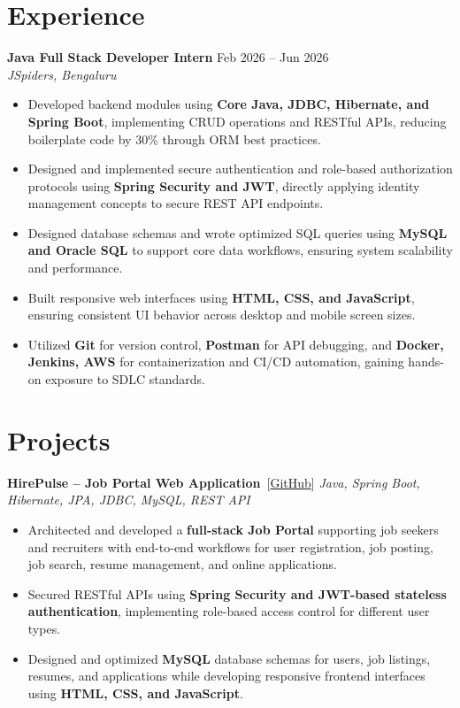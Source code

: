 \documentclass[9.5pt,a4paper]{article}
\begin{document}
\section{Experience}
\textbf{Java Full Stack Developer Intern} \hfill Feb 2026 -- Jun 2026\\
\textit{JSpiders, Bengaluru}
\begin{itemize}
    \item Developed backend modules using \textbf{Core Java, JDBC, Hibernate, and Spring Boot}, implementing CRUD operations and RESTful APIs, reducing boilerplate code by 30\% through ORM best practices.
    \item Designed and implemented secure authentication and role-based authorization protocols using \textbf{Spring Security and JWT}, directly applying identity management concepts to secure REST API endpoints.
    \item Designed database schemas and wrote optimized SQL queries using \textbf{MySQL and Oracle SQL} to support core data workflows, ensuring system scalability and performance.
    \item Built responsive web interfaces using \textbf{HTML, CSS, and JavaScript}, ensuring consistent UI behavior across desktop and mobile screen sizes.
    \item Utilized \textbf{Git} for version control, \textbf{Postman} for API debugging, and \textbf{Docker, Jenkins, AWS} for containerization and CI/CD automation, gaining hands-on exposure to SDLC standards.
\end{itemize}

\section{Projects}
\textbf{HirePulse -- Job Portal Web Application} \,[\href{https://github.com/preethamvs6/Hirepulse}{GitHub}] \hfill \textit{Java, Spring Boot, Hibernate, JPA, JDBC, MySQL, REST API}
\begin{itemize}
    \item Architected and developed a \textbf{full-stack Job Portal} supporting job seekers and recruiters with end-to-end workflows for user registration, job posting, job search, resume management, and online applications.
    \item Secured RESTful APIs using \textbf{Spring Security and JWT-based stateless authentication}, implementing role-based access control for different user types.
    \item Designed and optimized \textbf{MySQL} database schemas for users, job listings, resumes, and applications while developing responsive frontend interfaces using \textbf{HTML, CSS, and JavaScript}.
\end{itemize}
\end{document}
